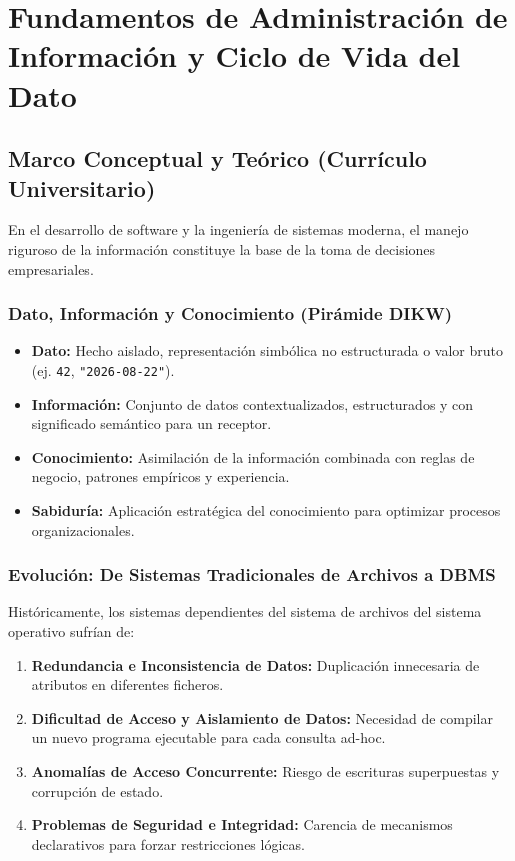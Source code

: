 \chapter{Fundamentos de Administraci\'on de Informaci\'on y Ciclo de Vida del Dato}
\label{cap:fundamentos_informacion}

\section{Marco Conceptual y Te\'orico (Curr\'iculo Universitario)}

En el desarrollo de software y la ingenier\'ia de sistemas moderna, el manejo riguroso de la informaci\'on constituye la base de la toma de decisiones empresariales.

\subsection{Dato, Informaci\'on y Conocimiento (Pir\'amide DIKW)}
\begin{itemize}
    \item \textbf{Dato:} Hecho aislado, representaci\'on simb\'olica no estructurada o valor bruto (ej. \texttt{42}, \texttt{"2026-08-22"}).
    \item \textbf{Informaci\'on:} Conjunto de datos contextualizados, estructurados y con significado sem\'antico para un receptor.
    \item \textbf{Conocimiento:} Asimilaci\'on de la informaci\'on combinada con reglas de negocio, patrones emp\'iricos y experiencia.
    \item \textbf{Sabidur\'ia:} Aplicaci\'on estrat\'egica del conocimiento para optimizar procesos organizacionales.
\end{itemize}

\subsection{Evoluci\'on: De Sistemas Tradicionales de Archivos a DBMS}
Hist\'oricamente, los sistemas dependientes del sistema de archivos del sistema operativo sufr\'ian de:
\begin{enumerate}
    \item \textbf{Redundancia e Inconsistencia de Datos:} Duplicaci\'on innecesaria de atributos en diferentes ficheros.
    \item \textbf{Dificultad de Acceso y Aislamiento de Datos:} Necesidad de compilar un nuevo programa ejecutable para cada consulta ad-hoc.
    \item \textbf{Anomal\'ias de Acceso Concurrente:} Riesgo de escrituras superpuestas y corrupci\'on de estado.
    \item \textbf{Problemas de Seguridad e Integridad:} Carencia de mecanismos declarativos para forzar restricciones l\'ogicas.
\end{enumerate}

